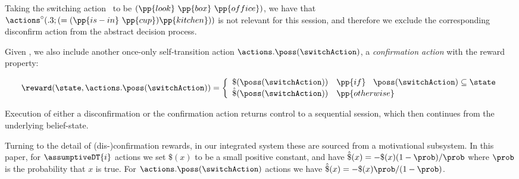 \noindent Taking the switching action \switchAction\ to be
$(\pp{look}~\pp{box}~\pp{office})$, we have that
$\actions^{\circ}(.3;(=(\pp{is-in}~\pp{cup})\pp{kitchen}))$ is not
relevant for this session, and therefore we exclude the corresponding
disconfirm action from the abstract decision process.

Given \switchAction, we also include another once-only self-transition
action $\actions.\poss(\switchAction)$, a \emph{confirmation action}
with the reward property:

\[
\reward(\state, \actions.\poss(\switchAction)) = \bigg\{ \begin{array}{ll}
\$(\poss(\switchAction)) & \pp{if}~\;\; \poss(\switchAction) \subseteq \state \\
\hat\$(\poss(\switchAction)) & \pp{otherwise} \\
\end{array}
\]

Execution of either a disconfirmation or the confirmation action
returns control to a sequential session, which then continues from the
underlying belief-state.

Turning to the detail of (dis-)confirmation rewards, in our integrated
system these are sourced from a motivational subsystem. In this paper,
for $\assumptiveDT{i}$ actions we set $\$(x)$ to be a small positive
constant, and have $\hat\$(x)= - \$(x)(1 - \prob) /
\prob$ where $\prob$ is the probability that $x$ is true. For
$\actions.\poss(\switchAction)$ actions we have $\hat\$(x)= -
\$(x)\prob/(1-\prob)$.







